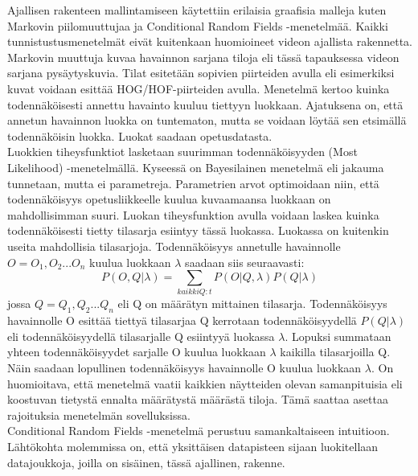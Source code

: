 Ajallisen rakenteen mallintamiseen käytettiin erilaisia graafisia malleja kuten Markovin piilomuuttujaa ja Conditional Random Fields -menetelmää.
Kaikki tunnistustusmenetelmät eivät kuitenkaan huomioineet videon ajallista rakennetta. \citep {6239178}\\ 

Markovin muuttuja kuvaa havainnon sarjana tiloja eli tässä tapauksessa videon sarjana pysäytyskuvia. 
Tilat esitetään sopivien piirteiden avulla eli esimerkiksi kuvat voidaan esittää HOG/HOF-piirteiden avulla. 
Menetelmä kertoo kuinka todennäköisesti annettu havainto kuuluu tiettyyn luokkaan. 
Ajatuksena on, että annetun havainnon luokka on tuntematon, mutta se voidaan löytää sen etsimällä todennäköisin luokka. 
Luokat saadaan opetusdatasta.\\

Luokkien tiheysfunktiot lasketaan suurimman todennäköisyyden
(Most Likelihood) -menetelmällä. Kyseessä on Bayesilainen menetelmä eli jakauma tunnetaan, mutta ei parametreja.
Parametrien arvot optimoidaan niin, että todennäköisyys opetusliikkeelle kuulua kuvaamaansa luokkaan on mahdollisimman suuri.
Luokan tiheysfunktion avulla voidaan laskea kuinka todennäköisesti tietty tilasarja esiintyy tässä luokassa.
Luokassa on kuitenkin useita mahdollisia tilasarjoja. Todennäköisyys annetulle havainnolle $O = O_{1}, O_{2}...O_{n}$ kuulua 
luokkaan $\lambda$ saadaan siis seuraavasti:
\begin{equation}
P(O,Q|\lambda) = \sum\limits_{kaikki Q:t}P(O|Q, \lambda)P(Q|\lambda)
\end{equation}
jossa $Q = Q_{1}, Q_{2} ... Q_{n}$ eli Q on määrätyn mittainen tilasarja. Todennäköisyys havainnolle O esittää
tiettyä tilasarjaa Q kerrotaan todennäköisyydellä $P(Q|\lambda)$ eli todennäköisyydellä tilasarjalle Q esiintyyä luokassa $\lambda$. 
Lopuksi summataan yhteen todennäköisyydet sarjalle O kuulua luokkaan $\lambda$ kaikilla tilasarjoilla Q. 
Näin saadaan lopullinen todennäköisyys havainnolle O kuulua luokkaan $\lambda$. On huomioitava, että menetelmä vaatii
kaikkien näytteiden olevan samanpituisia eli koostuvan tietystä ennalta määrätystä määrästä tiloja. Tämä saattaa asettaa
rajoituksia menetelmän sovelluksissa.\citep {18626}\\

Conditional Random Fields -menetelmä perustuu samankaltaiseen intuitioon. Lähtökohta molemmissa on, että yksittäisen 
datapisteen sijaan luokitellaan datajoukkoja, joilla on sisäinen, tässä ajallinen, rakenne. \citep {1315232}\\

